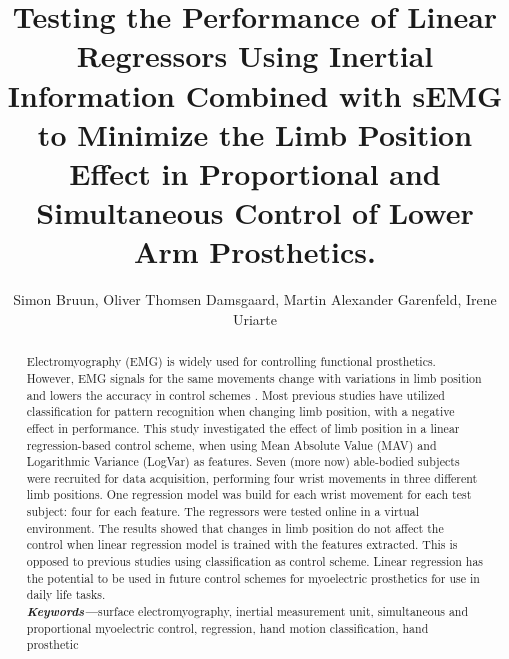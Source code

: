 \documentclass[a4paper, 10pt, conference]{ieeeconf}      %
\title{\LARGE \bf
	Testing the Performance of Linear Regressors Using Inertial Information Combined with sEMG to Minimize the Limb Position Effect in Proportional and Simultaneous Control of Lower Arm Prosthetics.
}%
\author{Simon Bruun, Oliver Thomsen Damsgaard, Martin Alexander Garenfeld, Irene Uriarte}%
\begin{document}
	
	
	
	\maketitle
	\thispagestyle{empty}
	\pagestyle{empty}
	
	
	\begin{abstract}
Electromyography (EMG) is widely used for controlling functional prosthetics. However, EMG signals for the same movements change with variations in limb position and lowers the accuracy in control schemes \cite{fougner2012}. Most previous studies have utilized classification for pattern recognition when changing limb position, with a negative effect in performance. %
This study investigated the effect of limb position in a linear regression-based control scheme, when using 
Mean Absolute Value (MAV) and Logarithmic Variance (LogVar) as features. %
Seven (more now) able-bodied subjects were recruited for data acquisition, performing four wrist movements in three different limb positions. One regression model %
was build for each wrist movement for each test subject: four for each feature. The regressors were tested online in a virtual environment. %
The results showed that changes in limb position do not affect the control when linear regression model is trained with the %
features extracted. This is opposed to previous studies using classification as control scheme. Linear regression has the potential to be used in future control schemes for myoelectric prosthetics for use in daily life tasks.\\


\textit{\textbf{Keywords---}}surface electromyography, inertial measurement unit, simultaneous and proportional myoelectric control, regression, hand motion classification, hand prosthetic


	\end{abstract}
	
\end{document}

